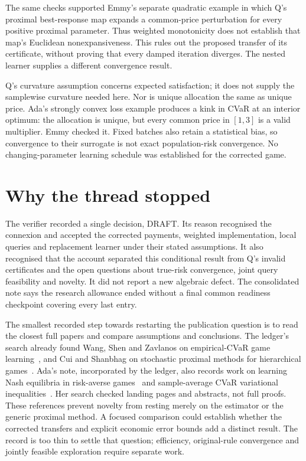 \documentclass{article}
\begin{document}
The same checks supported Emmy's separate quadratic example in which Q's proximal best-response map expands a
common-price perturbation for every positive proximal parameter.
Thus weighted monotonicity does not establish that map's Euclidean nonexpansiveness.
This rules out the proposed transfer of its certificate, without proving that every damped iteration diverges.
The nested learner supplies a different convergence result.

Q's curvature assumption concerns expected satisfaction; it does not supply the samplewise curvature needed here.
Nor is unique allocation the same as unique price.
Ada's strongly convex loss example produces a kink in CVaR at an interior optimum: the allocation is unique,
but every common price in \([1,3]\) is a valid multiplier.
Emmy checked it.
Fixed batches also retain a statistical bias, so convergence to their surrogate is not exact population-risk convergence.
No changing-parameter learning schedule was established for the corrected game.

\section{Why the thread stopped}
The verifier recorded a single decision, DRAFT.
Its reason recognised the connexion and accepted the corrected payments, weighted implementation, local
queries and replacement learner under their stated assumptions.
It also recognised that the account separated this conditional result from Q's invalid certificates and the
open questions about true-risk convergence, joint query feasibility and novelty.
It did not report a new algebraic defect.
The consolidated note says the research allowance ended without a final common readiness checkpoint covering every last entry.

The smallest recorded step towards restarting the publication question is to read the closest full papers and
compare assumptions and conclusions.
The ledger's search already found Wang, Shen and Zavlanos on empirical-CVaR game learning~\cite{wang22}, and
Cui and Shanbhag on stochastic proximal methods for hierarchical games~\cite{cui}.
Ada's note, incorporated by the ledger, also records work on learning Nash equilibria in risk-averse
games~\cite{wang24} and sample-average CVaR variational inequalities~\cite{saa}.
Her search checked landing pages and abstracts, not full proofs.
These references prevent novelty from resting merely on the estimator or the generic proximal method.
A focused comparison could establish whether the corrected transfers and explicit economic error bounds add a distinct result.
The record is too thin to settle that question; efficiency, original-rule convergence and jointly feasible
exploration require separate work.



\end{document}
